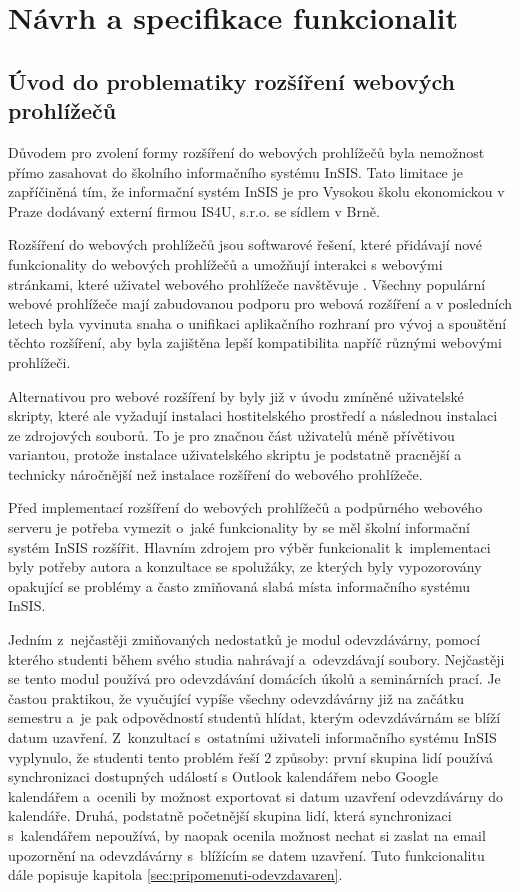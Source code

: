 \chapter{Návrh a specifikace funkcionalit}\label{chap:navrh-a-specifikace}

\section{Úvod do problematiky rozšíření webových prohlížečů}

Důvodem pro zvolení formy rozšíření do webových prohlížečů byla nemožnost přímo zasahovat do školního informačního systému InSIS. Tato limitace je zapříčiněná tím, že informační systém InSIS je  pro Vysokou školu ekonomickou v Praze dodávaný externí firmou IS4U, s.r.o. se sídlem v Brně. 

Rozšíření do webových prohlížečů jsou softwarové řešení, které přidávají nové funkcionality do webových prohlížečů a umožňují interakci s webovými stránkami, které uživatel webového prohlížeče navštěvuje \cite{web_extensions_2019}. Všechny populární webové prohlížeče mají zabudovanou podporu pro webová rozšíření a v posledních letech byla vyvinuta snaha o unifikaci aplikačního rozhraní pro vývoj a spouštění těchto rozšíření, aby byla zajištěna lepší kompatibilita napříč různými webovými prohlížeči.  

Alternativou pro webové rozšíření by byly již v úvodu zmíněné uživatelské skripty, které ale vyžadují instalaci hostitelského prostředí a následnou instalaci ze zdrojových souborů. To je pro značnou část uživatelů méně přívětivou variantou, protože instalace uživatelského skriptu je podstatně pracnější a technicky náročnější než instalace rozšíření do webového prohlížeče. 

Před implementací rozšíření do webových prohlížečů a podpůrného webového serveru je potřeba vymezit o~jaké funkcionality by se měl školní informační systém InSIS rozšířit. 
Hlavním zdrojem pro výběr funkcionalit k~implementaci byly potřeby autora a konzultace se spolužáky, ze kterých byly vypozorovány opakující se problémy a často zmiňovaná slabá místa informačního systému InSIS. 

Jedním z~nejčastěji zmiňovaných nedostatků je modul odevzdávárny, pomocí kterého studenti během svého studia nahrávají a~odevzdávají soubory. Nejčastěji se tento modul používá pro odevzdávání domácích úkolů a seminárních prací. Je častou praktikou, že vyučující vypíše všechny odevzdávárny již na začátku semestru a~je pak odpovědností studentů hlídat, kterým odevzdávárnám se blíží datum uzavření. Z~konzultací s~ostatními uživateli informačního systému InSIS vyplynulo, že studenti tento problém řeší 2 způsoby: první skupina lidí používá synchronizaci dostupných událostí s Outlook kalendářem nebo Google kalendářem a~ocenili by možnost exportovat si datum uzavření odevzdávárny do kalendáře. Druhá, podstatně početnější skupina lidí, která synchronizaci s~kalendářem nepoužívá, by naopak ocenila možnost nechat si zaslat na email upozornění na odevzdávárny s~blížícím se datem uzavření. Tuto funkcionalitu dále popisuje kapitola \ref{sec:pripomenuti-odevzdavaren}.

